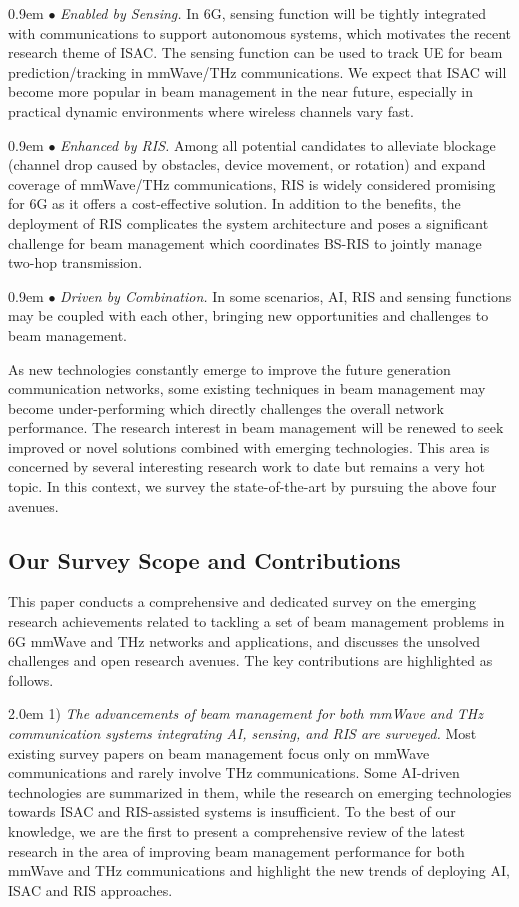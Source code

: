 \documentclass[journal,comsoc]{IEEEtran}
\begin{document}
\hangindent 0.9em
\noindent
$\bullet$ \emph{Enabled by Sensing.} In 6G, sensing function will be tightly integrated with communications to support autonomous systems, which motivates the recent research theme of ISAC. The sensing function can be used to track UE for beam prediction/tracking in mmWave/THz communications. We expect that ISAC will become more popular in beam management in the near future, especially in practical dynamic environments where wireless channels vary fast.

\hangindent 0.9em
\noindent
$\bullet$ \emph{Enhanced by RIS.} Among all potential candidates to alleviate blockage (channel drop caused by obstacles, device movement, or rotation) and expand coverage of mmWave/THz communications, RIS is widely considered promising for 6G as it offers a cost-effective solution. In addition to the benefits, the deployment of RIS complicates the system architecture and poses a significant challenge for beam management which coordinates BS-RIS to jointly manage two-hop transmission.


\hangindent 0.9em
\noindent
$\bullet$ \emph{Driven by Combination.} In some scenarios, AI, RIS and sensing functions may be coupled with each other, bringing new opportunities and challenges to beam management.


As new technologies constantly emerge to improve the future generation communication networks, some existing techniques in beam management may become under-performing which directly challenges the overall network performance. The research interest in beam management will be renewed to seek improved or novel solutions combined with emerging technologies. This area is concerned by several interesting research work to date but remains a very hot topic. In this context, we survey the state-of-the-art by pursuing the above four avenues.




\subsection{Our Survey Scope and Contributions}
This paper conducts a comprehensive and dedicated survey on the emerging research achievements related to tackling a set of beam management problems in 6G mmWave and THz networks and applications, and discusses the unsolved challenges and open research avenues. The key contributions are highlighted as follows.


\hangindent 2.0em
1) \emph{The advancements of beam management for both mmWave and THz communication systems integrating AI, sensing, and RIS are surveyed.} Most existing survey papers on beam management focus only on mmWave communications and rarely involve THz communications. Some AI-driven technologies are summarized in them, while the research on emerging technologies towards ISAC and RIS-assisted systems is insufficient. To the best of our knowledge, we are the first to present a comprehensive review of the latest research in the area of improving beam management performance for both mmWave and THz communications and highlight the new trends of deploying AI, ISAC and RIS approaches.
\end{document}
